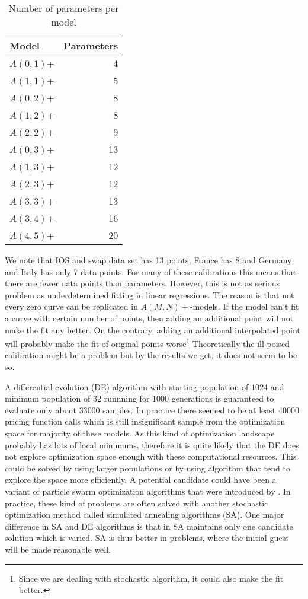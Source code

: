 \begin{table}[H]
	\centering
	\begin{tabular}{lr}
		Model & Parameters \\
		\toprule
		$A(0,1)$+ & 4 \\
		$A(1,1)$+ & 5 \\
		$A(0,2)$+ & 8 \\
		$A(1,2)$+ & 8 \\
		$A(2,2)$+ & 9 \\
		$A(0,3)$+ & 13 \\
		$A(1,3)$+ & 12 \\
		$A(2,3)$+ & 12 \\
		$A(3,3)$+ & 13 \\
		$A(3,4)$+ & 16 \\
		$A(4,5)$+ & 20 \\
		\bottomrule
	\end{tabular}
	
	\caption{Number of parameters per model}
	\label{model_dimensions}
	
\end{table}

We note that IOS and swap data set has 13 points, France has 8 and Germany and Italy has only 7 data points. For many of these calibrations this means that there are fewer data points than parameters. However, this is not as serious problem as underdetermined fitting in linear regressions. The reason is that not every zero curve can be replicated in $A(M,N)+$-models. If the model can't fit a curve with certain number of points, then adding an additional point will not make the fit any better. On the contrary, adding an additional interpolated point will probably make the fit of original points worse\footnote{Since we are dealing with stochastic algorithm, it could also make the fit better.} Theoretically the ill-poised calibration might be a problem but by the results we get, it does not seem to be so.

A differential evolution (DE) algorithm with starting population of $1024$ and minimum population of $32$ runnning for $1000$ generations is guaranteed to evaluate only about $33 000$ samples. In practice there seemed to be at least $40 000$ pricing function calls which is still insignificant sample from the optimization space for majority of these models. As this kind of optimization landscape probably has lots of local minimums, therefore it is quite likely that the DE does not explore optimization space enough with these computational resources. This could be solved by using larger populations or by using algorithm that tend to explore the space more efficiently. A potential candidate could have been a variant of particle swarm optimization algorithms that were introduced by \textcite{eberhart1995particle}. In practice, these kind of problems are often solved with another stochastic optimization method called simulated annealing algorithms (SA). One major difference in SA and DE algorithms is that in SA maintains only one candidate solution which is varied. SA is thus better in problems, where the initial guess will be made reasonable well.	

